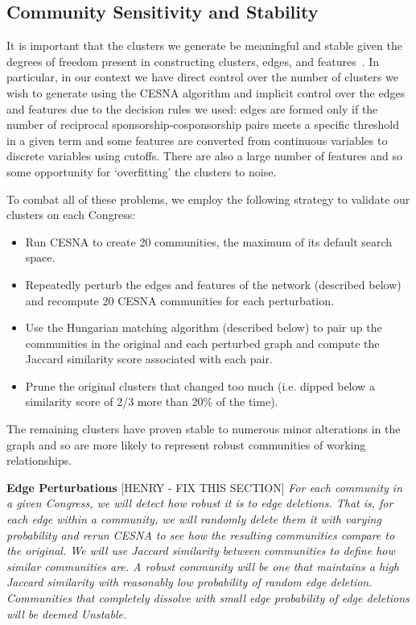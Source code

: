 \subsection{Community Sensitivity and Stability}

It is important that the clusters we generate be meaningful and stable given the
degrees of freedom present in constructing clusters, edges, and
features~\cite{Tzerpos}. In particular, in our context we have direct control
over the number of clusters we wish to generate using the CESNA algorithm and
implicit control over the edges and features due to the decision rules we used:
edges are formed only if the number of reciprocal sponsorship-cosponsorship
pairs meets a specific threshold in a given term and some features are converted
from continuous variables to discrete variables using cutoffs. There are also a
large number of features and so some opportunity for `overfitting' the clusters
to noise.

To combat all of these problems, we employ the following strategy to validate our clusters on each Congress:
\begin{itemize}
	\item Run CESNA to create 20 communities, the maximum of its default search space.
	\item Repeatedly perturb the edges and features of the network (described below) and recompute 20 CESNA communities for each perturbation.
	\item Use the Hungarian matching algorithm (described below) to pair up the communities in the original and each perturbed graph and compute the Jaccard similarity score associated with each pair.
	\item Prune the original clusters that changed too much (i.e. dipped below a similarity score of 2/3 more than 20\% of the time).
\end{itemize}

The remaining clusters have proven stable to numerous minor alterations in the
graph and so are more likely to represent robust communities of working
relationships.

\textbf{Edge Perturbations}
[HENRY - FIX THIS SECTION]
\textit{For each community in a given Congress, we will detect how robust it is to edge 
deletions. That is, for each edge within a community, we will randomly delete 
them it with varying probability and rerun CESNA to see how the resulting 
communities compare to the original. We will use Jaccard similarity between 
communities to define how similar communities are. A robust community will be 
one that maintains a high Jaccard similarity with reasonably low probability of 
random edge deletion. Communities that completely dissolve with small edge 
probability of edge deletions will be deemed Unstable.}

